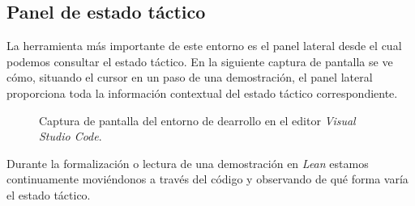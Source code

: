 \subsection*{Panel de estado táctico}

La herramienta más importante de este entorno es el panel lateral desde el cual
podemos consultar el estado táctico. En la siguiente captura de pantalla se ve
cómo, situando el cursor en un paso de una demostración, el panel lateral
proporciona toda la información contextual del estado táctico correspondiente.

\begin{figure}[htbp]
	\centerline{}
	\caption*{Captura de pantalla del entorno de dearrollo en el editor \textit{Visual Studio Code}.}
	\label{figure:entorno}
\end{figure}

Durante la formalización o lectura de una demostración en \textit{Lean} estamos
continuamente moviéndonos a través del código y observando de qué forma varía el
estado táctico.


